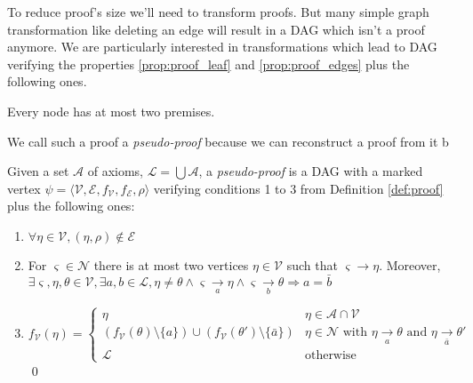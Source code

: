 \documentclass{llncs}
\newcommand{\dual}[1]{{\ensuremath{\bar{#1}}}}
\begin{document}
To reduce proof's size we'll need to transform proofs. But many simple graph transformation like
deleting an edge will result in a DAG which isn't a proof anymore. We are particularly interested in
transformations which lead to DAG verifying the properties \ref{prop:proof_leaf} and
\ref{prop:proof_edges} plus the following ones.

\begin{property}
Every node has at most two premises.
\end{property}

We call such a proof a \emph{pseudo-proof} because we can reconstruct a proof from it b

\begin{definition}
Given a set $\mathcal{A}$ of axioms, $\mathcal{L} = \bigcup{\mathcal{A}}$, a \emph{pseudo-proof} is
a DAG with a marked vertex $\psi = \langle \mathcal{V}, \mathcal{E}, f_\mathcal{V}, f_\mathcal{E},
\rho \rangle$ verifying conditions 1 to 3 from Definition \ref{def:proof} plus the following ones:
\begin{enumerate}[nosep,start=4]
  \item $\forall \eta \in \mathcal{V}, (\eta, \rho) \notin \mathcal{E}$
  \item For $\varsigma \in \mathcal{N}$ there is at most two vertices $\eta \in \mathcal{V}$ such
    that $\varsigma \rightarrow \eta$. Moreover, $\exists \varsigma, \eta, \theta \in \mathcal{V},
    \exists a, b \in \mathcal{L}, \eta \neq \theta \wedge \varsigma \xrightarrow[a]{} \eta \wedge
    \varsigma \xrightarrow[b]{} \theta \Rightarrow a = \dual{b}$
  \item %
    \begin{equation*}
      f_\mathcal{V}(\eta) = \begin{cases}
        \eta & \eta \in \mathcal{A} \cap \mathcal{V} \\
        \left(f_\mathcal{V}(\theta) \setminus \{a\}\right) \cup
        \left(f_\mathcal{V}(\theta') \setminus \{\dual{a}\}\right) &
              \eta \in \mathcal{N} \text{ with } \eta \xrightarrow[a]{} \theta \text{ and }
                                               \eta \xrightarrow[\dual{a}]{} \theta' \\
        \mathcal{L} & \text{otherwise}
      \end{cases}
    \end{equation*}
  \qed
\end{enumerate}
\end{definition}
\end{document}
